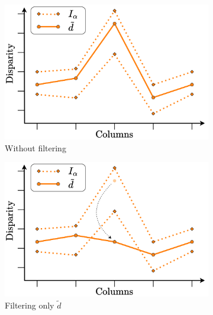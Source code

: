 \begin{figure}
    \centering
    \begin{subfigure}[t]{0.32\linewidth}
        \centering
        \includegraphics[width=\linewidth]{Images/Chap_5/Median_filtering_1.png}
        \caption{Without filtering}
        \label{fig:median_filtering_1}
    \end{subfigure}
    \hfill\begin{subfigure}[t]{0.32\linewidth}
        \includegraphics[width=1\linewidth]{Images/Chap_5/Median_filtering_2.png}
        \caption{Filtering only $\tilde{d}$}
        \label{fig:median_filtering_2}
    \end{subfigure}\hfill
    \begin{subfigure}[t]{0.32\linewidth}
        \centering

\end{subfigure}
\end{figure}
